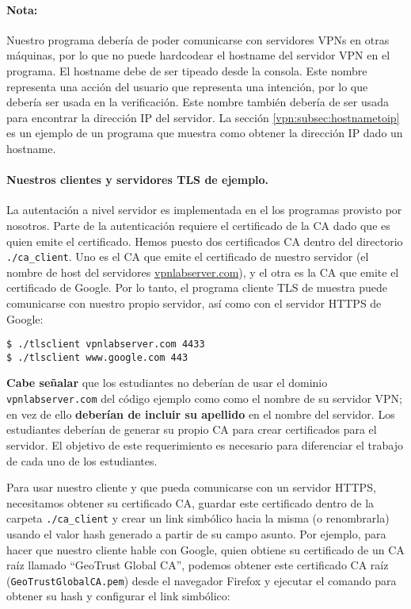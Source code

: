 \paragraph{Nota:} Nuestro programa \miniVPN debería de poder comunicarse con servidores VPNs en otras máquinas, por lo que no puede hardcodear el hostname del servidor VPN en el programa. El hostname debe de ser tipeado desde la consola. Este nombre representa una acción del usuario que representa una intención, por lo que debería ser usada en la verificación. Este nombre también debería de ser usada para encontrar la dirección IP del servidor. La sección \ref{vpn:subsec:hostnametoip} es un ejemplo de un programa que muestra como obtener la dirección IP dado un hostname.


\paragraph{Nuestros clientes y servidores TLS de ejemplo.}  La autentación a nivel servidor es implementada en el los programas provisto por nosotros. Parte de la autenticación requiere el certificado de la CA dado que es quien emite el certificado.
Hemos puesto dos certificados CA dentro del directorio \texttt{./ca\_client}. Uno es el CA que emite el certificado de nuestro servidor (el nombre de host del servidores \url{vpnlabserver.com}),
y el otra es la CA que emite el certificado de Google.
Por lo tanto, el programa cliente TLS de muestra puede comunicarse con nuestro propio servidor, así como con el servidor HTTPS de Google: 

\begin{lstlisting}
$ ./tlsclient vpnlabserver.com 4433
$ ./tlsclient www.google.com 443
\end{lstlisting}


\textbf{Cabe señalar} que los estudiantes no deberían de usar el dominio \texttt{vpnlabserver.com} del código ejemplo como como el nombre de su servidor VPN; en vez de ello \textbf{deberían de incluir su apellido} en el nombre del servidor. Los estudiantes deberían de generar su propio CA para crear certificados para el servidor. El objetivo de este requerimiento es necesario para diferenciar el trabajo de cada uno de los estudiantes.

Para usar nuestro cliente y que pueda comunicarse con un servidor HTTPS, necesitamos obtener su certificado CA, guardar este certificado dentro de la carpeta \texttt{./ca\_client}  y crear un link simbólico hacia la misma (o renombrarla) usando el valor hash generado a partir de su campo asunto.
Por ejemplo, para hacer que nuestro cliente hable con Google, quien obtiene su certificado de un CA raíz llamado ``GeoTrust Global CA'', podemos obtener este certificado CA raíz  (\texttt{GeoTrustGlobalCA.pem})   desde el navegador Firefox y ejecutar el comando para obtener su hash y configurar el link simbólico:


